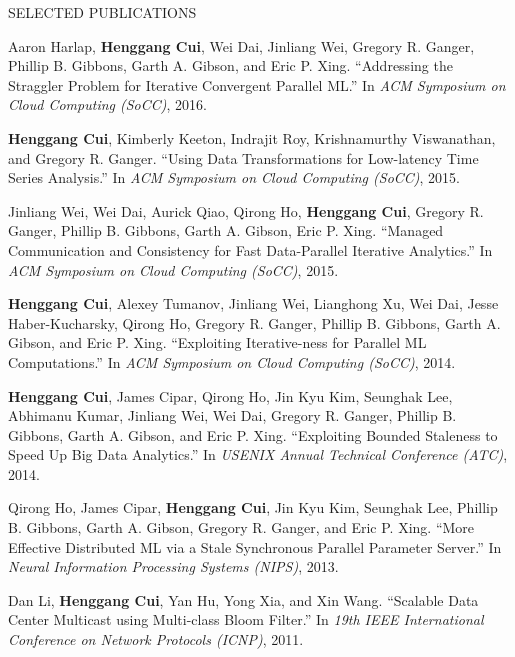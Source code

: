 \documentclass{resume} %
\begin{document}
\begin{rSection}{SELECTED PUBLICATIONS}
{    \item
    [11]
        Aaron Harlap, {\bf Henggang Cui}, Wei Dai, Jinliang Wei, Gregory R. Ganger, Phillip B. Gibbons, Garth A. Gibson, and Eric P. Xing.
        ``Addressing the Straggler Problem for Iterative Convergent Parallel ML.''
        In \emph{ACM Symposium on Cloud Computing (SoCC)}, 2016.
    \item
    [12]
        {\bf Henggang Cui}, Kimberly Keeton, Indrajit Roy, Krishnamurthy Viswanathan, and Gregory R. Ganger.
        ``Using Data Transformations for Low-latency Time Series Analysis.''
        In \emph{ACM Symposium on Cloud Computing (SoCC)}, 2015.
    \item
    [13]
        Jinliang Wei, Wei Dai, Aurick Qiao, Qirong Ho, {\bf Henggang Cui}, Gregory R. Ganger, Phillip B. Gibbons, Garth A. Gibson, Eric P. Xing.
        ``Managed Communication and Consistency for Fast Data-Parallel Iterative Analytics.''
        In \emph{ACM Symposium on Cloud Computing (SoCC)}, 2015.
    \item
    [14]
        {\bf Henggang Cui}, Alexey Tumanov, Jinliang Wei, Lianghong Xu, Wei Dai, Jesse Haber-Kucharsky, Qirong Ho, Gregory R. Ganger, Phillip B. Gibbons, Garth A. Gibson, and Eric P. Xing.
        ``Exploiting Iterative-ness for Parallel ML Computations.''
        In \emph{ACM Symposium on Cloud Computing (SoCC)}, 2014.
    \item
    [15]
        {\bf Henggang Cui}, James Cipar, Qirong Ho, Jin Kyu Kim, Seunghak Lee, Abhimanu Kumar, Jinliang Wei, Wei Dai, Gregory R. Ganger, Phillip B. Gibbons, Garth A. Gibson, and Eric P. Xing.
        ``Exploiting Bounded Staleness to Speed Up Big Data Analytics.''
        In \emph{USENIX Annual Technical Conference (ATC)}, 2014.
    \item
    [16]
        Qirong Ho, James Cipar, {\bf Henggang Cui}, Jin Kyu Kim, Seunghak Lee, Phillip B. Gibbons, Garth A. Gibson, Gregory R. Ganger, and Eric P. Xing.
        ``More Effective Distributed ML via a Stale Synchronous Parallel Parameter Server.''
        In \emph{Neural Information Processing Systems (NIPS)}, 2013.
    \item
    [17]
        Dan Li, {\bf Henggang Cui}, Yan Hu, Yong Xia, and Xin Wang.
        ``Scalable Data Center Multicast using Multi-class Bloom Filter.''
        In \emph{19th IEEE International Conference on Network Protocols (ICNP)}, 2011.
}
\end{rSection}
\vspace{-.05in}
\end{document}
